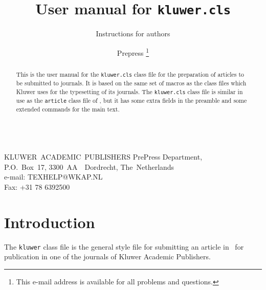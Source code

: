 \documentclass[namedreferences]{kluwer}
\begin{document}
\begin{article}


\begin{opening}
\title{User manual for {\tt kluwer.cls}}
\subtitle{Instructions for authors}
\author{Prepress \thanks{This
    e-mail address is available for all problems and questions.}}
\begin{ao}\\
KLUWER~ACADEMIC~PUBLISHERS PrePress Department,\\
P.O.~Box~17, 3300~AA~~Dordrecht, The~Netherlands\\
e-mail: TEXHELP@WKAP.NL\\
Fax: +31 78 6392500
\end{ao}
\date{\filedate}


\begin{abstract}
This is the user manual for the {\tt kluwer.cls} class file for the
preparation of articles to be submitted to journals.  It is based on
the same set of macros as the class files which Kluwer uses for the
typesetting of its journals.  The {\tt kluwer.cls} class file is
similar in use as the {\tt article} class file of \LaTeXe, but it
has some extra fields in the preamble and some extended commands
for the main text.
\end{abstract}
%
%

\end{opening}

{\footnotesize\tableofcontents}


\section{Introduction}

The {\tt kluwer} class file is the general style file for submitting
an article in \LaTeXe\ for publication in one of the journals of
Kluwer Academic Publishers.


\end{article}
\end{document}
